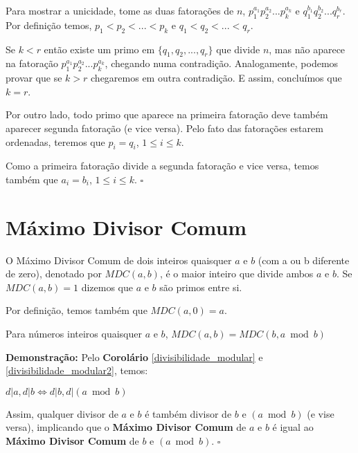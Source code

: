 Para mostrar a unicidade, tome as duas fatorações de $n$, $p_1^{a_1}p_2^{a_2}...p_k^{a_k}$ e $q_1^{b_1}q_2^{b_2}...q_r^{b_r}$.
Por definição temos, $p_1 < p_2 < ... < p_k$ e $q_1 < q_2 < ... < q_r$. 

Se $k<r$ então existe um primo em $\{q_1,q_2,...,q_r\}$ que divide $n$, mas não aparece na fatoração $p_1^{a_1}p_2^{a_2}...p_k^{a_k}$,
chegando numa contradição. Analogamente, podemos provar que se $k>r$ chegaremos em outra contradição. E assim, concluímos que $k=r$.

Por outro lado, todo primo que aparece na primeira fatoração deve também aparecer segunda fatoração (e vice versa). Pelo fato das
fatorações estarem ordenadas, teremos que $p_i = q_i$, $1\leq i\leq k$.



 Como a primeira fatoração divide a segunda fatoração e vice versa, temos também que $a_i = b_i$, $1\leq i\leq k$. $\square$





\section{Máximo Divisor Comum}

\begin{definition}
O Máximo Divisor Comum de dois inteiros quaisquer $a$ e $b$ (com a ou b diferente de zero), denotado por $MDC(a,b)$, é o maior inteiro que divide ambos $a$ e $b$. 
Se $MDC(a,b) = 1$ dizemos que $a$ e $b$ são primos entre si.

Por definição, temos também que $MDC(a,0) = a$.
\end{definition}


\begin{corollary}\label{gcd_modular}
Para números inteiros quaisquer $a$ e $b$, $MDC(a,b) = MDC(b, a \bmod b)$
\end{corollary}
\textbf{Demonstração:}
Pelo \textbf{Corolário} \autoref{divisibilidade_modular} e \autoref{divisibilidade_modular2}, temos:

$d|a, d|b \Leftrightarrow d|b, d|(a \bmod b)$

Assim, qualquer divisor de $a$ e $b$ é também divisor de $b$ e $(a \bmod b)$ (e vise versa), implicando que o \textbf{Máximo Divisor Comum} de $a$ e $b$
é igual ao \textbf{Máximo Divisor Comum} de $b$ e $(a \bmod b)$. $\square$



